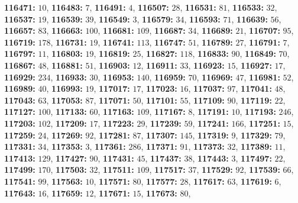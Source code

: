 \textsf{\bfseries 116471:} $10$, \textsf{\bfseries 116483:} $7$, \textsf{\bfseries 116491:} $4$, \textsf{\bfseries 116507:} $28$, \textsf{\bfseries 116531:} $81$, \textsf{\bfseries 116533:} $32$, \textsf{\bfseries 116537:} $19$, \textsf{\bfseries 116539:} $39$, \textsf{\bfseries 116549:} $3$, \textsf{\bfseries 116579:} $34$, \textsf{\bfseries 116593:} $71$, \textsf{\bfseries 116639:} $56$, \textsf{\bfseries 116657:} $83$, \textsf{\bfseries 116663:} $100$, \textsf{\bfseries 116681:} $109$, \textsf{\bfseries 116687:} $34$, \textsf{\bfseries 116689:} $21$, \textsf{\bfseries 116707:} $95$, \textsf{\bfseries 116719:} $178$, \textsf{\bfseries 116731:} $19$, \textsf{\bfseries 116741:} $113$, \textsf{\bfseries 116747:} $51$, \textsf{\bfseries 116789:} $27$, \textsf{\bfseries 116791:} $7$, \textsf{\bfseries 116797:} $11$, \textsf{\bfseries 116803:} $19$, \textsf{\bfseries 116819:} $25$, \textsf{\bfseries 116827:} $118$, \textsf{\bfseries 116833:} $90$, \textsf{\bfseries 116849:} $70$, \textsf{\bfseries 116867:} $48$, \textsf{\bfseries 116881:} $51$, \textsf{\bfseries 116903:} $12$, \textsf{\bfseries 116911:} $33$, \textsf{\bfseries 116923:} $15$, \textsf{\bfseries 116927:} $17$, \textsf{\bfseries 116929:} $234$, \textsf{\bfseries 116933:} $30$, \textsf{\bfseries 116953:} $140$, \textsf{\bfseries 116959:} $70$, \textsf{\bfseries 116969:} $47$, \textsf{\bfseries 116981:} $52$, \textsf{\bfseries 116989:} $40$, \textsf{\bfseries 116993:} $19$, \textsf{\bfseries 117017:} $17$, \textsf{\bfseries 117023:} $16$, \textsf{\bfseries 117037:} $97$, \textsf{\bfseries 117041:} $48$, \textsf{\bfseries 117043:} $63$, \textsf{\bfseries 117053:} $87$, \textsf{\bfseries 117071:} $50$, \textsf{\bfseries 117101:} $55$, \textsf{\bfseries 117109:} $90$, \textsf{\bfseries 117119:} $22$, \textsf{\bfseries 117127:} $100$, \textsf{\bfseries 117133:} $60$, \textsf{\bfseries 117163:} $109$, \textsf{\bfseries 117167:} $8$, \textsf{\bfseries 117191:} $10$, \textsf{\bfseries 117193:} $246$, \textsf{\bfseries 117203:} $102$, \textsf{\bfseries 117209:} $17$, \textsf{\bfseries 117223:} $29$, \textsf{\bfseries 117239:} $59$, \textsf{\bfseries 117241:} $166$, \textsf{\bfseries 117251:} $15$, \textsf{\bfseries 117259:} $24$, \textsf{\bfseries 117269:} $92$, \textsf{\bfseries 117281:} $87$, \textsf{\bfseries 117307:} $145$, \textsf{\bfseries 117319:} $9$, \textsf{\bfseries 117329:} $79$, \textsf{\bfseries 117331:} $34$, \textsf{\bfseries 117353:} $3$, \textsf{\bfseries 117361:} $286$, \textsf{\bfseries 117371:} $91$, \textsf{\bfseries 117373:} $32$, \textsf{\bfseries 117389:} $11$, \textsf{\bfseries 117413:} $129$, \textsf{\bfseries 117427:} $90$, \textsf{\bfseries 117431:} $45$, \textsf{\bfseries 117437:} $38$, \textsf{\bfseries 117443:} $3$, \textsf{\bfseries 117497:} $22$, \textsf{\bfseries 117499:} $170$, \textsf{\bfseries 117503:} $32$, \textsf{\bfseries 117511:} $109$, \textsf{\bfseries 117517:} $37$, \textsf{\bfseries 117529:} $92$, \textsf{\bfseries 117539:} $66$, \textsf{\bfseries 117541:} $99$, \textsf{\bfseries 117563:} $10$, \textsf{\bfseries 117571:} $80$, \textsf{\bfseries 117577:} $28$, \textsf{\bfseries 117617:} $63$, \textsf{\bfseries 117619:} $6$, \textsf{\bfseries 117643:} $16$, \textsf{\bfseries 117659:} $12$, \textsf{\bfseries 117671:} $15$, \textsf{\bfseries 117673:} $80$, 
